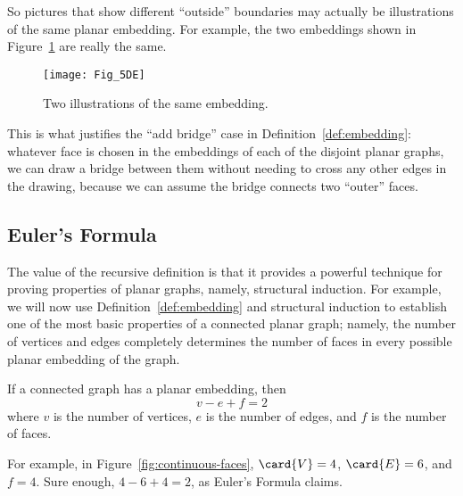 So pictures that show different ``outside'' boundaries may actually be
illustrations of the same planar embedding.  For example, the two
embeddings shown in Figure~\ref{fig:5DE} are really the same.

\begin{figure}\redrawn

\texttt{[image: Fig\_5DE]}

\caption{Two illustrations of the same embedding.}
\label{fig:5DE}
\end{figure}

This is what justifies the ``add bridge'' case in
Definition~\ref{def:embedding}: whatever face is chosen in the
embeddings of each of the disjoint planar graphs, we can draw a
bridge between them without needing to cross any other edges in the
drawing, because we can assume the bridge connects two ``outer''
faces.

\subsection{Euler's Formula}

The value of the recursive definition is that it provides a powerful
technique for proving properties of planar graphs, namely, structural
induction.  For example, we will now use
Definition~\ref{def:embedding} and structural induction to establish
one of the most basic properties of a connected planar graph; namely,
the number of vertices and edges completely determines the number of
faces in every possible planar embedding of the graph.

\begin{theorem}\label{thm:eulers_formula}
If a connected graph has a planar embedding, then
\begin{equation*}
    v - e + f = 2
\end{equation*}
where $v$ is the number of vertices, $e$ is the number of edges, and
$f$ is the number of faces.
\end{theorem}

For example, in Figure~\ref{fig:continuous-faces}, $\card{V} = 4$,
$\card{E} = 6$, and $f = 4$.  Sure enough, $4 - 6 + 4 = 2$, as Euler's
Formula claims.

